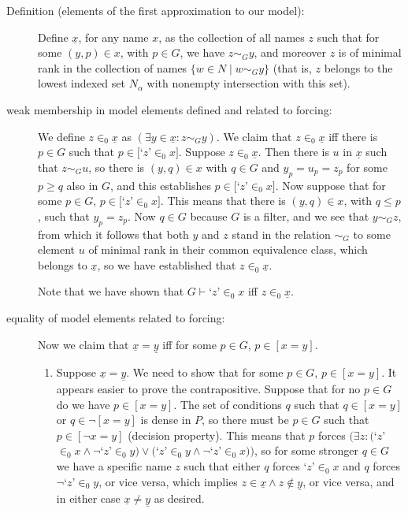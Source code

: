 \documentclass[12pt]{book}
\begin{document}
\begin{description}
\item[Definition (elements of the first approximation to our model):]  Define $\underline{x}$, for any name $x$, as the collection of all names $z$ such that for some $(y,p) \in x$, with $p \in G$, we have $z \sim_G y$, and moreover $z$ is of minimal rank in the collection of names $\{w \in N \mid w \sim_G y\}$ (that is, $z$ belongs to the lowest indexed set $N_{\alpha}$ with nonempty intersection with this set).

\item[weak membership in model elements defined and related to forcing:]  We define $z \in_0 \underline{x}$ as $(\exists y \in \underline{x}:z \sim_G y)$.  We claim that $z \in_0 \underline{x}$ iff there is $p \in G$ such that $p \in [$`$z$'$\in_0 x]$.
Suppose $z \in_0 \underline{x}$.  Then there is $u$ in $\underline{x}$ such that $z \sim_G u$, so there is $(y,q) \in x$ with $q \in G$ and $y_p=u_p=z_p$ for some $p \geq q$ also in $G$, and this establishes $p \in [$`$z$'$\in_0 x]$.  Now suppose that for some $p \in G$, $p \in [$`$z$'$\in_0 x]$.  This means that there is $(y,q) \in x$, with $q \leq p$,
such that $y_p=z_p$.  Now $q \in G$ because $G$ is a filter, and we see that $y \sim_G z$, from which it follows that both $y$ and $z$ stand in the relation $\sim_G$ to some element $u$ of minimal rank in their common equivalence class, which belongs to $\underline{x}$, so we have established that $z \in_0 \underline{x}$.

Note that we have shown that $G \vdash $`$z$'$\in_0 x$ iff $z \in_0 \underline{x}$.

\item[equality of model elements related to forcing:]  Now we claim that $\underline{x} = \underline{y}$ iff for some $p \in G$, $p \in [x=y]$.
\begin{enumerate}
 \item Suppose $\underline{x} = \underline{y}$.  We need to show that for some $p \in G$,
$p \in [x=y]$.  It appears easier to prove the contrapositive.  Suppose that for no $p \in G$ do we have $p \in [x=y]$.  The set of conditions $q$ such that $q \in [x=y]$ or $q \in \neg[x=y]$ is dense in $P$, so there must be $p \in G$ such that $p \in [\neg x=y]$ (decision property).   This means that $p$ forces $(\exists z:($`$z$'$ \in _0 x \wedge \neg$`$ z$'$ \in_0 y) \vee ($`$z$'$ \in _0 y\wedge \neg$`$ z$'$ \in_0 x))$, so for some stronger $q \in G$ we have a specific name $z$ such that either $q$ forces `$z$'$ \in_0 x$ and $q$ forces $\neg $`$z$'$ \in_0 y$, or vice versa, which implies $z \in\underline{x} \wedge z \not\in \underline{y}$, or vice versa, and in either case $\underline{x} \neq \underline{y}$ as desired.


\end{enumerate}
\end{description}
\end{document}
